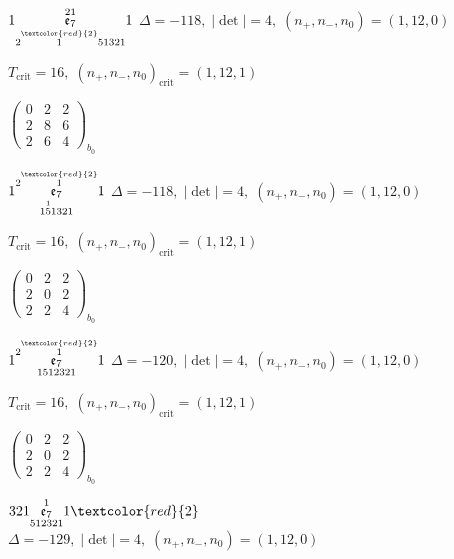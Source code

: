 \documentclass[10pt]{article}
\begin{document}
$1\overset{21}{\underset{2\overset{\textcolor{red}{2}}{1}51321}{\mathfrak{e}_7}}1$ \quad $\Delta=-118,\; |\det|=4,\; (n_+,n_-,n_0)=(1,12,0)$

\hspace{1em}$T_{\text{crit}}=16,\; (n_+,n_-,n_0)_{\text{crit}}=(1,12,1)$

\hspace{2em}$\left(\begin{smallmatrix}0 & 2 & 2 \\ 2 & 8 & 6 \\ 2 & 6 & 4\end{smallmatrix}\right)_{\!b_0}$

\smallskip

$1\overset{2\overset{\textcolor{red}{2}}{1}}{\underset{1\overset{1}{5}1321}{\mathfrak{e}_7}}1$ \quad $\Delta=-118,\; |\det|=4,\; (n_+,n_-,n_0)=(1,12,0)$

\hspace{1em}$T_{\text{crit}}=16,\; (n_+,n_-,n_0)_{\text{crit}}=(1,12,1)$

\hspace{2em}$\left(\begin{smallmatrix}0 & 2 & 2 \\ 2 & 0 & 2 \\ 2 & 2 & 4\end{smallmatrix}\right)_{\!b_0}$

\smallskip

$1\overset{2\overset{\textcolor{red}{2}}{1}}{\underset{1512321}{\mathfrak{e}_7}}1$ \quad $\Delta=-120,\; |\det|=4,\; (n_+,n_-,n_0)=(1,12,0)$

\hspace{1em}$T_{\text{crit}}=16,\; (n_+,n_-,n_0)_{\text{crit}}=(1,12,1)$

\hspace{2em}$\left(\begin{smallmatrix}0 & 2 & 2 \\ 2 & 0 & 2 \\ 2 & 2 & 4\end{smallmatrix}\right)_{\!b_0}$

\smallskip

$321\overset{1}{\underset{512321}{\mathfrak{e}_7}}1\textcolor{red}{2}$ \quad $\Delta=-129,\; |\det|=4,\; (n_+,n_-,n_0)=(1,12,0)$
\end{document}
